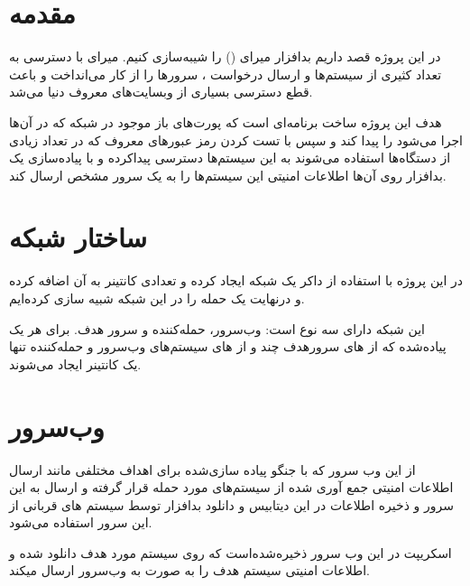 \section{مقدمه}

در این پروژه قصد داریم بدافزار میرای () را شیبه‌سازی کنیم. میرای با دسترسی به تعداد کثیری از سیستم‌ها و ارسال درخواست ،  سرورها را از کار می‌انداخت و باعث قطع دسترسی بسیاری از وبسایت‌های معروف دنیا می‌شد. 

هدف این پروژه ساخت برنامه‌ای است که پورت‌های باز موجود در شبکه که  در آن‌ها اجرا می‌شود را پیدا کند و سپس با تست کردن رمز عبور‌های معروف که در تعداد زیادی از دستگاه‌ها استفاده می‌شوند به این سیستم‌ها دسترسی پیداکرده و با پیاده‌سازی یک بدافزار روی آن‌ها اطلاعات امنیتی این سیستم‌ها را به یک سرور مشخص ارسال کند. 

\section{ساختار شبکه}

در این پروژه با استفاده از داکر یک شبکه ایجاد کرده و تعدادی کانتینر به آن اضافه کرده و درنهایت یک حمله را در این شبکه شبیه سازی کرده‌ایم.  

این شبکه دارای سه نوع  است: وب‌سرور، حمله‌کننده و سرور هدف. برای هر  یک  پیاده‌شده که از های سرورهدف چند و از های سیستم‌های وب‌سرور و حمله‌کننده تنها یک کانتینر ایجاد می‌شوند. 

\section{وب‌سرور}

از این وب سرور که با جنگو پیاده سازی‌شده برای اهداف مختلفی مانند ارسال اطلاعات امنیتی جمع آوری شده از سیستم‌های مورد حمله قرار گرفته و ارسال به این سرور و ذخیره اطلاعات در این دیتابیس و دانلود بدافزار توسط سیستم های قربانی از این سرور استفاده می‌شود. 

اسکریپت  در این وب سرور ذخیره‌شده‌است که روی سیستم مورد هدف دانلود شده و اطلاعات امنیتی سیستم هدف را به صورت  به وب‌سرور ارسال میکند. 

